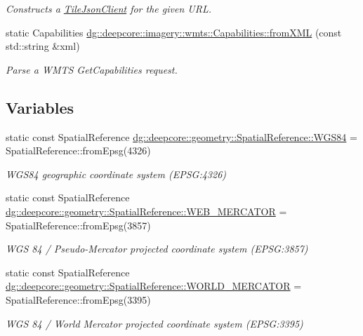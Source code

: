 \begin{DoxyCompactItemize}
\begin{DoxyCompactList}\small\item\em Constructs a \hyperlink{classdg_1_1deepcore_1_1imagery_1_1_tile_json_client}{Tile\+Json\+Client} for the given U\+RL. \end{DoxyCompactList}\item 
static Capabilities \hyperlink{group___imagery_module_ga988934c965e1ad4eac2bdc22f8563349}{dg\+::deepcore\+::imagery\+::wmts\+::\+Capabilities\+::from\+X\+ML} (const std\+::string \&xml)
\begin{DoxyCompactList}\small\item\em Parse a W\+M\+TS Get\+Capabilities request. \end{DoxyCompactList}\end{DoxyCompactItemize}
\subsection*{Variables}
\begin{DoxyCompactItemize}
\item 
static const Spatial\+Reference \hyperlink{group___imagery_module_gaec91c35670e3d08a4113cea23f7f9ed8}{dg\+::deepcore\+::geometry\+::\+Spatial\+Reference\+::\+W\+G\+S84} = Spatial\+Reference\+::from\+Epsg(4326)
\begin{DoxyCompactList}\small\item\em W\+G\+S84 geographic coordinate system (E\+P\+SG\+:4326) \end{DoxyCompactList}\item 
static const Spatial\+Reference \hyperlink{group___imagery_module_ga91bb1b661e9fc39639771e80c1fc98e4}{dg\+::deepcore\+::geometry\+::\+Spatial\+Reference\+::\+W\+E\+B\+\_\+\+M\+E\+R\+C\+A\+T\+OR} = Spatial\+Reference\+::from\+Epsg(3857)
\begin{DoxyCompactList}\small\item\em W\+GS 84 / Pseudo-\/\+Mercator projected coordinate system (E\+P\+SG\+:3857) \end{DoxyCompactList}\item 
static const Spatial\+Reference \hyperlink{group___imagery_module_ga07533c6dcdfd100538307ceef2152f24}{dg\+::deepcore\+::geometry\+::\+Spatial\+Reference\+::\+W\+O\+R\+L\+D\+\_\+\+M\+E\+R\+C\+A\+T\+OR} = Spatial\+Reference\+::from\+Epsg(3395)
\begin{DoxyCompactList}\small\item\em W\+GS 84 / World Mercator projected coordinate system (E\+P\+SG\+:3395) \end{DoxyCompactList}\end{DoxyCompactItemize}


